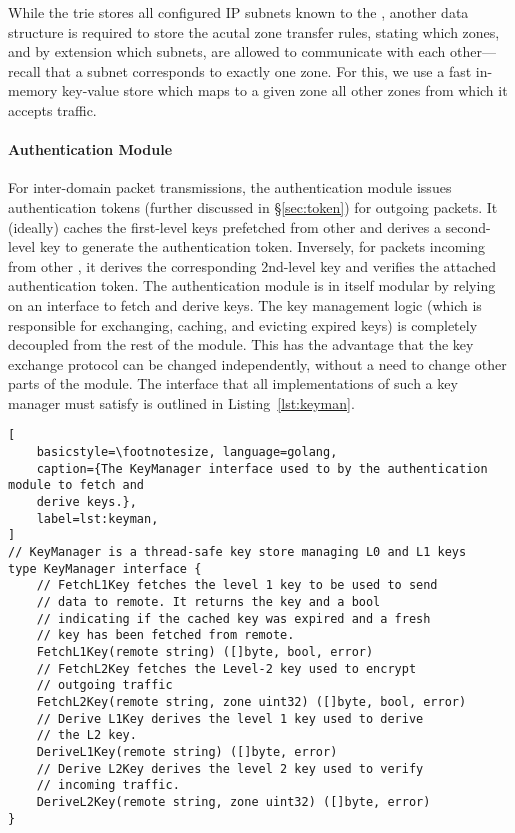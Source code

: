 While the trie stores all configured IP subnets known to the \tp, another data structure is required
to store the acutal zone transfer rules, stating which zones, and by extension which subnets, are
allowed to communicate with each other---recall that a subnet corresponds to exactly one zone. For this,
we use a fast in-memory key-value store which maps to a given zone all other zones from which it
accepts traffic.

\paragraph{Authentication Module}
For inter-domain packet transmissions, the authentication module issues
authentication tokens (further discussed in \S\ref{sec:token}) for outgoing packets.
It (ideally) caches the first-level keys prefetched
from other \tps and derives a second-level key to generate the authentication token. Inversely, for
packets incoming from other \tps, it derives the corresponding 2nd-level key
and verifies the attached authentication token. The authentication module is in itself modular by
relying on an interface to fetch and derive keys. The key management logic (which is
responsible for exchanging, caching, and evicting expired keys) is completely
decoupled from the rest of the module. This has the advantage that the key exchange protocol can be changed
independently, without a need to change other parts of the module. The interface that all
implementations of such a key manager must satisfy is outlined in Listing~\ref{lst:keyman}.

\begin{minipage}{\linewidth}
	\begin{lstlisting}[
	basicstyle=\footnotesize, language=golang,
	caption={The KeyManager interface used to by the authentication module to fetch and
	derive keys.},
	label=lst:keyman,
]
// KeyManager is a thread-safe key store managing L0 and L1 keys
type KeyManager interface {
	// FetchL1Key fetches the level 1 key to be used to send
	// data to remote. It returns the key and a bool
	// indicating if the cached key was expired and a fresh
	// key has been fetched from remote.
	FetchL1Key(remote string) ([]byte, bool, error)
	// FetchL2Key fetches the Level-2 key used to encrypt
	// outgoing traffic
	FetchL2Key(remote string, zone uint32) ([]byte, bool, error)
	// Derive L1Key derives the level 1 key used to derive
	// the L2 key.
	DeriveL1Key(remote string) ([]byte, error)
	// Derive L2Key derives the level 2 key used to verify
	// incoming traffic.
	DeriveL2Key(remote string, zone uint32) ([]byte, error)
}
	\end{lstlisting}
\end{minipage}
		

